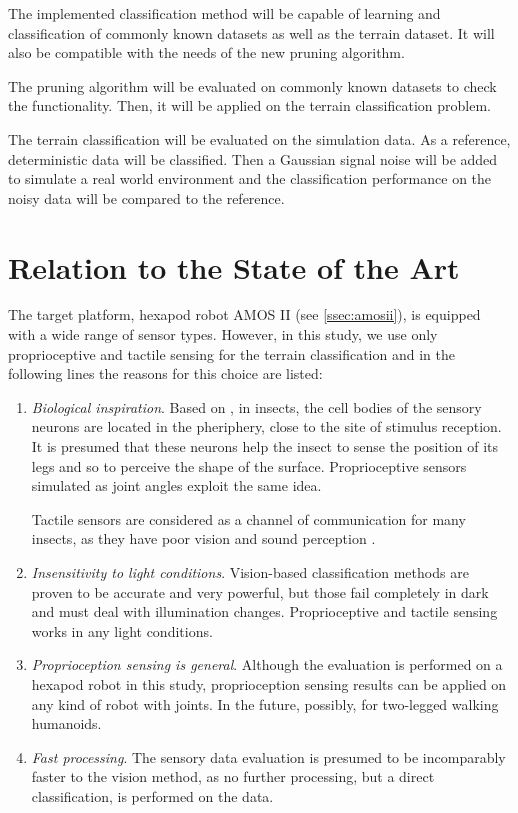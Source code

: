 The implemented classification method will be capable of learning and classification of commonly known datasets as well as the terrain dataset. It will also be compatible with the needs of the new pruning algorithm.

The pruning algorithm will be evaluated on commonly known datasets to check the functionality. Then, it will be applied on the terrain classification problem.

The terrain classification will be evaluated on the simulation data. As a reference, deterministic data will be classified. Then a Gaussian signal noise will be added to simulate a real world environment and the classification performance on the noisy data will be compared to the reference.

\section{Relation to the State of the Art}
The target platform, hexapod robot AMOS II (see \cref{ssec:amosii}), is equipped with a wide range of sensor types. However, in this study, we use only proprioceptive and tactile sensing for the terrain classification and in the following lines the reasons for this choice are listed: 

\begin{enumerate}
\item \textit{Biological inspiration}. Based on \citep{article:insect}, in insects, the cell bodies of the sensory neurons are located in the pheriphery, close to the site of stimulus reception. It is presumed that these neurons help the insect to sense the position of its legs and so to perceive the shape of the surface. Proprioceptive sensors simulated as joint angles exploit the same idea.

Tactile sensors are considered as a channel of communication for many insects, as they have poor vision and sound perception \citep{misc:insect_tactile}. 

\item \textit{Insensitivity to light conditions}. Vision-based classification methods are proven to be accurate and very powerful, but those fail completely in dark and must deal with illumination changes. Proprioceptive and tactile sensing works in any light conditions.

\item \textit{Proprioception sensing is general}. Although the evaluation is performed on a hexapod robot in this study, proprioception sensing results can be applied on any kind of robot with joints. In the future, possibly, for two-legged walking humanoids.

\item \textit{Fast processing}. The sensory data evaluation is presumed to be incomparably faster to the vision method, as no further processing, but a direct classification, is performed on the data.
\end{enumerate}

